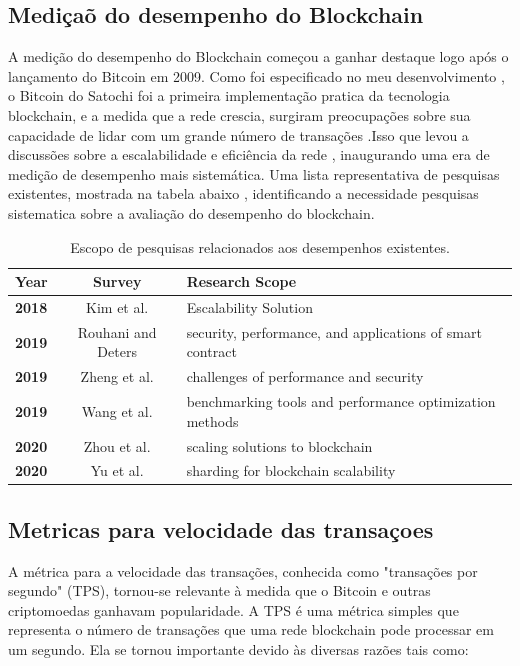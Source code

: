 \subsection{Mediçaõ do desempenho do Blockchain}
    A medição do desempenho do Blockchain começou a ganhar destaque logo após o lançamento do Bitcoin em 2009.
    Como foi especificado no meu desenvolvimento , o Bitcoin do Satochi foi a primeira implementação pratica da tecnologia blockchain, e a medida que a rede crescia, surgiram preocupações sobre sua capacidade de lidar com um grande número de transações .Isso que levou a discussões sobre a escalabilidade e eficiência da rede , inaugurando uma era de medição de desempenho mais sistemática. Uma lista representativa de pesquisas existentes, mostrada na tabela abaixo , identificando a necessidade pesquisas sistematica sobre a avaliação do desempenho do blockchain.
\begin{table}[H]
\renewcommand{\arraystretch}{2} %
\begin{tabular}{|>{\bfseries}l|c|p{7cm}|}
\hline
\textbf{Year} & \textbf{Survey} & \textbf{Research Scope} \\
\hline
2018 & Kim et al.\cite{kim2018survey} & Escalability Solution\\
\hline
2019 & Rouhani and Deters\cite{rouhani2019security} & security, performance, and applications of smart contract\\
\hline
2019 & Zheng et al.\cite{zheng2019survey}  & challenges of performance and security\\
\hline
2019 & Wang et al. \cite{alpak2021benchmarking} & benchmarking tools and performance optimization methods\\
\hline
2020 & Zhou et al. \cite{zhou2020solutions}  & scaling solutions to blockchain\\
\hline
2020 & Yu et al. \cite{xie2019survey}  & sharding for blockchain scalability \\
\hline
\end{tabular}
\caption{Escopo de pesquisas relacionados aos desempenhos existentes.}
\label{tab:Escopo de pesquisas relacionados aos desempenhos existentes}
\end{table}

\subsection{Metricas para velocidade das transaçoes}

    A métrica para a velocidade das transações, conhecida como "transações por segundo" (TPS), tornou-se relevante à medida que o Bitcoin e outras criptomoedas ganhavam popularidade. A TPS é uma métrica simples que representa o número de transações que uma rede blockchain pode processar em um segundo. Ela se tornou importante devido às diversas razões tais como:

